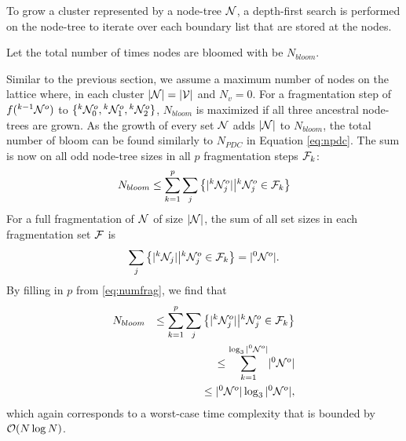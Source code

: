 To grow a cluster represented by a node-tree $\mathcal{N}$, a depth-first search is performed on the node-tree to iterate over each boundary list that are stored at the nodes.
\begin{definition}\label{def:nbloom}
  Let the total number of times nodes are bloomed with  be $N_{bloom}$.
\end{definition}

Similar to the previous section, we assume a maximum number of nodes on the lattice where, in each cluster $|\mathcal{N}| = |\mathcal{V}|$ and $N_v = 0$. For a fragmentation step of $f({}^{k-1}\mathcal{N}^o)$ to $\{{}^{k}\mathcal{N}^o_0, {}^{k}\mathcal{N}^o_1, {}^{k}\mathcal{N}^o_2\}$, $N_{bloom}$ is maximized if all three ancestral node-trees are grown. As the growth of every set $\mathcal{N}$ adds $|\mathcal{N}|$ to $N_{bloom}$, the total number of bloom can be found similarly to $N_{PDC}$ in Equation \eqref{eq:npdc}. The sum is now on all odd node-tree sizes in all $p$ fragmentation steps $\mathcal{F}_k$:
\begin{equation}\label{eq:nnode}
  N_{bloom} \leq \sum^{p}_{k=1}\sum_j \left\{ \abs{\pre{k}\nset^o_j} \big| \pre{k}\nset^o_j \in \m{F}_k \right\}
\end{equation}
For a full fragmentation of $\mathcal{N}$ of size $|\mathcal{N}|$, the sum of all set sizes in each fragmentation set $\mathcal{F}$ is
\begin{equation}\label{eq:sumsetsfrag}
  \sum_j \left\{ \abs{\pre{k}\nset_j} \big| \pre{k}\nset^o_j \in \m{F}_k \right\} = \abs{\pre{0}\nset^o}.
\end{equation}
By filling in $p$ from \eqref{eq:numfrag}, we find that
\begin{align}
  \nonumber & N_{bloom} & \leq \sum^{p}_{k=1}\sum_j \left\{ \lvert{}^{k}\mathcal{N}^o_j\rvert \big| {}^{k}\mathcal{N}^o_j \in \mathcal{F}_k \right\} & \\
  \nonumber &           & \leq \sum_{k=1}^{\log_3{\lvert{}^{0}\mathcal{N}^o\rvert}} \lvert{}^{0}\mathcal{N}^o\rvert                                  & \\
            &           & \leq \lvert{}^{0}\mathcal{N}^o\rvert\log_3{\lvert{}^{0}\mathcal{N}^o\rvert},                                               &
\end{align}
which again corresponds to a worst-case time complexity that is bounded by $\mathcal{O}(N\log{N})$.
